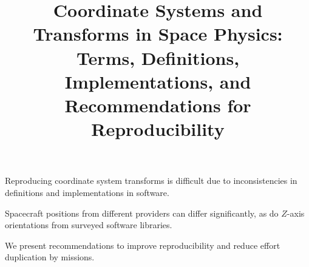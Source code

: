 \documentclass[draft]{agujournal2019}
\begin{document}
\title{Coordinate Systems and Transforms in Space Physics: Terms, Definitions, Implementations, and Recommendations for Reproducibility}









\noindent




\begin{keypoints}
\item Reproducing coordinate system transforms is difficult due to inconsistencies in definitions and implementations in software.
\item Spacecraft positions from different providers can differ significantly, as do $Z$-axis orientations from surveyed software libraries.
\item We present recommendations to improve reproducibility and reduce effort duplication by missions.
\end{keypoints}
\end{document}
